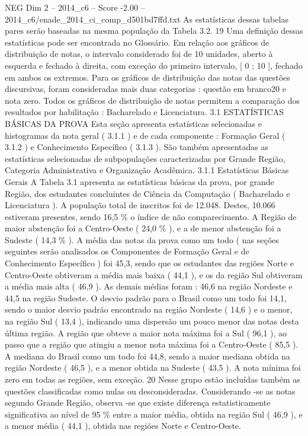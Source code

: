 \begin{textsample}{NEG Dim 2 – 2014\_c6 – Score -2.00 – 2014\_c6/enade\_2014\_ci\_comp\_d501bd7ffd.txt}
As estatísticas dessas tabelas pares serão baseadas na mesma população da Tabela 3.2. 19 Uma definição dessas estatísticas pode ser encontrada no Glossário.
Em relação aos gráficos de distribuição de notas, o intervalo considerado foi de 10 unidades, aberto à esquerda e fechado à direita, com exceção do primeiro intervalo, [ 0 ; 10 ], fechado em ambos os extremos.
Para os gráficos de distribuição das notas das questões discursivas, foram consideradas mais duas categorias : questão em branco20 e nota zero.
Todos os gráficos de distribuição de notas permitem a comparação dos resultados por habilitação : Bacharelado e Licenciatura. 3.1 ESTATÍSTICAS BÁSICAS DA PROVA Esta seção apresenta estatísticas selecionadas e histogramas da nota geral ( 3.1.1 ) e de cada componente : Formação Geral ( 3.1.2 ) e Conhecimento Específico ( 3.1.3 ).
São também apresentadas as estatísticas selecionadas de subpopulações caracterizadas por Grande Região, Categoria Administrativa e Organização Acadêmica. 3.1.1 Estatísticas Básicas Gerais A Tabela 3.1 apresenta as estatísticas básicas da prova, por grande Região, dos estudantes concluintes de Ciência da Computação ( Bacharelado e Licenciatura ).
A população total de inscritos foi de 12.048.
Destes, 10.066 estiveram presentes, sendo 16,5 \% o índice de não comparecimento.
A Região de maior abstenção foi a Centro-Oeste ( 24,0 \% ), e a de menor abstenção foi a Sudeste ( 14,3 \% ).
A média das notas da prova como um todo ( nas seções seguintes serão analisados os Componentes de Formação Geral e de Conhecimento Específico ) foi 45,3, sendo que os estudantes das regiões Norte e Centro-Oeste obtiveram a média mais baixa ( 44,1 ), e os da região Sul obtiveram a média mais alta ( 46,9 ).
As demais médias foram : 46,6 na região Nordeste e 44,5 na região Sudeste.
O desvio padrão para o Brasil como um todo foi 14,1, sendo o maior desvio padrão encontrado na região Nordeste ( 14,6 ) e o menor, na região Sul ( 13,4 ), indicando uma dispersão um pouco menor das notas desta última região.
A região que obteve a maior nota máxima foi a Sul ( 96,1 ), ao passo que a região que atingiu a menor nota máxima foi a Centro-Oeste ( 85,5 ).
A mediana do Brasil como um todo foi 44,8, sendo a maior mediana obtida na região Nordeste ( 46,5 ), e a menor obtida na Sudeste ( 43,5 ).
A nota mínima foi zero em todas as regiões, sem exceção. 20 Nesse grupo estão incluídas também as questões classificadas como nulas ou desconsideradas.
Considerando -se as notas segundo Grande Região, observa -se que existe diferença estatisticamente significativa ao nível de 95 \% entre a maior média, obtida na região Sul ( 46,9 ), e a menor média ( 44,1 ), obtida nas regiões Norte e Centro-Oeste.

\end{textsample}
